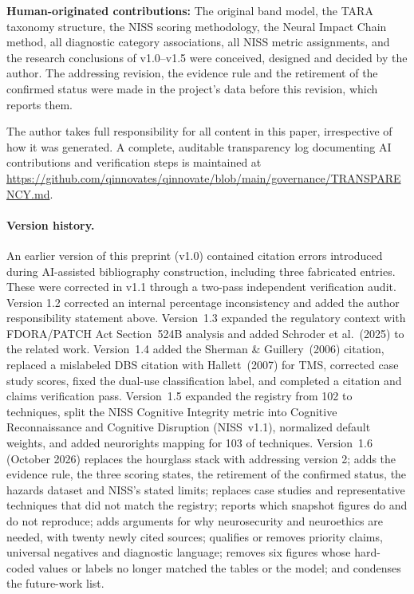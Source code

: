 \noindent\textbf{Human-originated contributions:} The original band model, the TARA
taxonomy structure, the NISS scoring methodology, the Neural Impact Chain method, all
diagnostic category associations, all NISS metric assignments, and the research conclusions
of v1.0--v1.5 were conceived, designed and decided by the author. The addressing revision,
the evidence rule and the retirement of the confirmed status were made in the project's data
before this revision, which reports them.

\noindent The author takes full responsibility for all content in this paper,
irrespective of how it was generated. A complete, auditable transparency log
documenting AI contributions and verification steps is maintained at
\url{https://github.com/qinnovates/qinnovate/blob/main/governance/TRANSPARENCY.md}.

\paragraph{Version history.}
An earlier version of this preprint (v1.0) contained citation errors
introduced during AI-assisted bibliography construction, including three
fabricated entries. These were corrected in v1.1 through a two-pass
independent verification audit. Version 1.2 corrected an internal percentage
inconsistency and added the author responsibility statement above.
Version~1.3 expanded the regulatory context with FDORA/PATCH Act Section~524B analysis and
added Schroder et al.~(2025) to the related work. Version~1.4 added the Sherman \&
Guillery~(2006) citation, replaced a mislabeled DBS citation with Hallett~(2007) for TMS,
corrected case study scores, fixed the dual-use classification label, and completed a
citation and claims verification pass. Version~1.5 expanded the registry from 102 to
\SnapshotTechniques{} techniques, split the NISS Cognitive Integrity metric into Cognitive
Reconnaissance and Cognitive Disruption (NISS~v1.1), normalized default weights, and added
neurorights mapping for 103 of \SnapshotTechniques{} techniques.
Version~1.6 (October 2026) replaces the hourglass stack with addressing version 2; adds the
evidence rule, the three scoring states, the retirement of the confirmed status, the hazards
dataset and NISS's stated limits; replaces case studies and representative techniques that
did not match the registry; reports which snapshot figures do and do not reproduce; adds
arguments for why neurosecurity and neuroethics are needed, with twenty newly cited
sources; qualifies or removes priority claims, universal negatives and diagnostic language;
removes six figures whose hard-coded values or labels no longer matched the tables or the
model; and condenses the future-work list.

